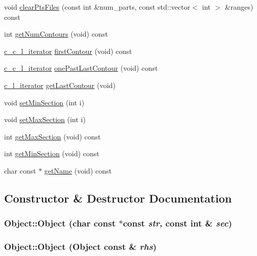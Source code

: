 \begin{CompactItemize}
\item 
void \hyperlink{classObject_025155f5287bdcac93487ad439292e5d}{clearPtsFiles} (const int \&num\_\-parts, const std::vector$<$ int $>$ \&ranges) const 
\item 
int \hyperlink{classObject_73aa0b9e0687d54c6f7e28897c53c60d}{getNumContours} (void) const 
\item 
\hyperlink{object_8h_a9270ce1987060966a7d0fb340f69570}{c\_\-c\_\-l\_\-iterator} \hyperlink{classObject_0f77fffbc4778fab83b512d3461c9104}{firstContour} (void) const 
\item 
\hyperlink{object_8h_a9270ce1987060966a7d0fb340f69570}{c\_\-c\_\-l\_\-iterator} \hyperlink{classObject_25ce9e8478daa0808393fa562a370d0e}{onePastLastContour} (void) const 
\item 
\hyperlink{object_8h_7f9b7c0270c54ab6a3a2cc02f9fb313a}{c\_\-l\_\-iterator} \hyperlink{classObject_fffbea3a9790bde6e0821ace2fe30b49}{getLastContour} (void)
\item 
void \hyperlink{classObject_2d0c6724dcfc370c55eefe0cb7ea9ddf}{setMinSection} (int i)
\item 
void \hyperlink{classObject_394f310255028c4c4475e98ba58b8243}{setMaxSection} (int i)
\item 
int \hyperlink{classObject_f429250aa5672a356e20fa73d8e2612a}{getMaxSection} (void) const 
\item 
int \hyperlink{classObject_6b0181000881749e20b32ae92a2b027e}{getMinSection} (void) const 
\item 
char const $\ast$ \hyperlink{classObject_c251f5325509fb0e624455b68c29cd40}{getName} (void) const 
\end{CompactItemize}


\subsection{Constructor \& Destructor Documentation}
\hypertarget{classObject_0cca670c8c001209999fe25b86db853e}{
\subsubsection[Object]{\setlength{\rightskip}{0pt plus 5cm}Object::Object (char const $\ast$const  {\em str}, \/  const int \& {\em sec})}}
\label{classObject_0cca670c8c001209999fe25b86db853e}


\hypertarget{classObject_6e166f85639b15a8b8f9b783a6de3b45}{
\subsubsection[Object]{\setlength{\rightskip}{0pt plus 5cm}Object::Object ({\bf Object} const \& {\em rhs})}}
\label{classObject_6e166f85639b15a8b8f9b783a6de3b45}




